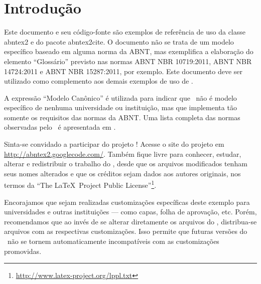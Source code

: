 \documentclass[12pt,openright,twoside,a4paper]{abntex2}
\begin{document}
 
\frenchspacing
 
 
\imprimircapa
 
\tableofcontents*
\cleardoublepage
  
 
\mainmatter
 
\chapter*[Introdução]{Introdução}
 
Este documento e seu código-fonte são exemplos de referência de uso da classe
\textsf{abntex2} e do pacote \textsf{abntex2cite}. O documento não se trata de
um modelo específico baseado em alguma norma da ABNT, mas exemplifica a
elaboração do elemento ``Glossário'' previsto nas normas ABNT NBR
10719:2011, ABNT NBR 14724:2011 e ABNT NBR 15287:2011, por exemplo. Este
documento deve ser utilizado como complemento aos demais exemplos de uso de
\abnTeX.

A expressão ``Modelo Canônico'' é utilizada para indicar que \abnTeX\ não é
modelo específico de nenhuma universidade ou instituição, mas que implementa tão
somente os requisitos das normas da ABNT. Uma lista completa das normas
observadas pelo \abnTeX\ é apresentada em .
 
Sinta-se convidado a participar do projeto \abnTeX! Acesse o site do projeto em
\url{http://abntex2.googlecode.com/}. Também fique livre para conhecer,
estudar, alterar e redistribuir o trabalho do \abnTeX, desde que os arquivos
modificados tenham seus nomes alterados e que os créditos sejam dados aos
autores originais, nos termos da ``The \LaTeX\ Project Public
License''\footnote{\url{http://www.latex-project.org/lppl.txt}}.
 
Encorajamos que sejam realizadas customizações específicas deste exemplo para
universidades e outras instituições --- como capas, folha de aprovação, etc.
Porém, recomendamos que ao invés de se alterar diretamente os arquivos do
\abnTeX, distribua-se arquivos com as respectivas customizações.
Isso permite que futuras versões do \abnTeX~não se tornem automaticamente
incompatíveis com as customizações promovidas.
 
\end{document}

